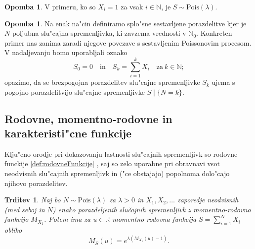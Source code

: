 \documentclass[12pt, a4paper, reqno]{amsart}
\theoremstyle{definition}
\newtheorem{opomba}[definicija]{Opomba}
\theoremstyle{plain}
\newtheorem{trditev}[definicija]{Trditev}
\newcommand{\R}{\mathbb{R}}
\newcommand{\N}{\mathbb{N}}
\newcommand{\1}{\mathds{1}}
\newcommand{\Pois}[1]{\text{Pois}(#1)}
\newcommand*{\refPriloga}[1]{%
  \begingroup
    \hypersetup{
      linkcolor=red,
      linkbordercolor=red,
    }%
    \ref{#1}%
  \endgroup
}
\begin{document}
    \begin{opomba}
        V primeru, ko so $X_i = 1$ za vsak $i\in\N$, je $S\sim\Pois{\lambda}$.
    \end{opomba}

    \begin{opomba}
        Na enak na"cin definiramo splo"sne sestavljene porazdelitve kjer je $N$ poljubna slu"cajna spremenljivka,
        ki zavzema vrednosti v $\N_0$. Konkreten primer nas zanima zaradi njegove povezave s sestavljenim
        Poissonovim procesom. V nadaljevanju bomo uporabljali oznako
        \begin{equation*}
            S_0 = 0 \quad \text{in} \quad S_k = \sum_{i=1}^kX_i \quad \text{za} \ k\in\N; 
        \end{equation*}
        opazimo, da se brezpogojna porazdelitev slu"cajne spremenljivke $S_k$ ujema s pogojno porazdelitvijo 
        slu"cajne spremenljivke $S\mid\{N = k\}$.
        \label{op:gneralCaseCOmpound}
    \end{opomba}

    \subsection{Rodovne, momentno-rodovne in karakteristi"cne funkcije} Klju"cno \newline orodje pri dokazovanju
    lastnosti slu"cajnih spremenljivk so rodovne funckije \refPriloga{def:rodovneFunkcije}, saj so zelo uporabne
    pri obravnavi vsot neodvisnih slu"cajnih spremenljivk in ("ce obstajajo) popolnoma dolo"cajo njihovo porazdelitev.  

    \begin{trditev}
        Naj bo $N\sim \Pois{\lambda}$  za $\lambda >0$ in $X_1, X_2, \dots$ zaporedje neodvisnih (med seboj in $N$)
        enako porazdeljenih slučajnih spremenljivk z momentno-rodovno funkcijo $M_{X_1}$. Potem ima za $u\in\R$
        momentno-rodovna funkcija $S = \sum_{i=1}^NX_i$ obliko
        \begin{equation*}
            M_{S}(u) = e^{\lambda \left(M_{X_1}(u) - 1\right)}.
        \end{equation*}
        \label{trd:MomentGener}
    \end{trditev}
    
\end{document}
